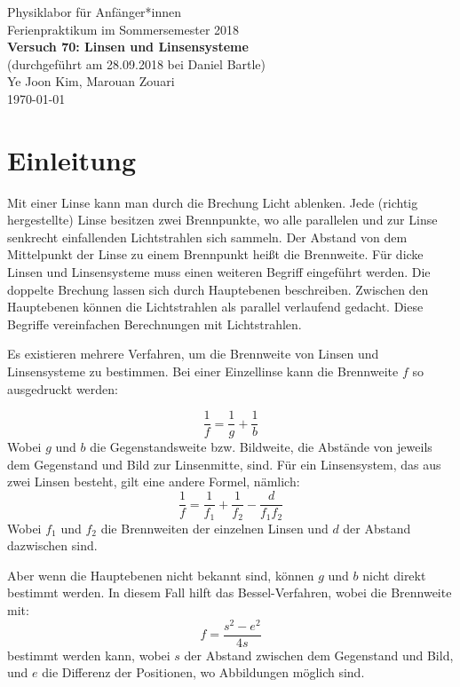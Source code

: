 \documentclass[11pt,a4paper]{article}
\begin{document}
	

{
	\centering 
	\large 
	Physiklabor für Anfänger*innen \\
	Ferienpraktikum im Sommersemester 2018 \\[4mm]
	\textbf{\LARGE 
		Versuch 70: Linsen und Linsensysteme
	} \\[3mm]
	(durchgeführt am 28.09.2018 bei Daniel Bartle) \\
	Ye Joon Kim, Marouan Zouari\\
	\today \\[10mm]
}
\tableofcontents
\newpage
\section{Einleitung}
Mit einer Linse kann man durch die Brechung Licht ablenken. Jede (richtig hergestellte) Linse besitzen zwei Brennpunkte, wo alle parallelen und zur Linse senkrecht einfallenden Lichtstrahlen sich sammeln. Der Abstand von dem Mittelpunkt der Linse zu einem Brennpunkt heißt die Brennweite. Für dicke Linsen und Linsensysteme muss einen weiteren Begriff eingeführt werden. Die doppelte Brechung lassen sich durch Hauptebenen beschreiben. Zwischen den Hauptebenen können die Lichtstrahlen als parallel verlaufend gedacht. Diese Begriffe vereinfachen Berechnungen mit Lichtstrahlen. 

Es existieren mehrere Verfahren, um die Brennweite von Linsen und Linsensysteme zu bestimmen. Bei einer Einzellinse kann die Brennweite $f$ so ausgedruckt werden: 

\begin{equation}
\frac{1}{f} = \frac{1}{g} + \frac{1}{b}
\end{equation}
Wobei $g$ und $b$ die Gegenstandsweite bzw. Bildweite, die Abstände von jeweils dem Gegenstand und Bild zur Linsenmitte, sind.
Für ein Linsensystem, das aus zwei Linsen besteht, gilt eine andere Formel, nämlich:
\begin{equation}
\frac{1}{f} = \frac{1}{f_1}+\frac{1}{f_2}-\frac{d}{f_1f_2}
\end{equation}
Wobei $f_1$ und $f_2$ die Brennweiten der einzelnen Linsen und $d$ der Abstand dazwischen sind. 

Aber wenn die Hauptebenen nicht bekannt sind, können $g$ und $b$ nicht direkt bestimmt werden. In diesem Fall hilft das Bessel-Verfahren, wobei die Brennweite mit:
\begin{equation}
f = \frac{s^2-e^2}{4s}
\end{equation}
bestimmt werden kann, wobei $s$ der Abstand zwischen dem Gegenstand und Bild, und $e$ die Differenz der Positionen, wo Abbildungen möglich sind. 
\end{document}
